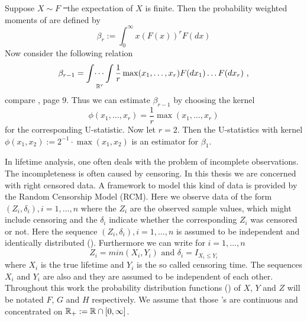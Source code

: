 %
\begin{example}
	Suppose $X\sim F$ \st\ the expectation of $X$ is finite. Then the probability weighted moments of are defined by
	$$\beta_r := \int_{0}^{\infty} x (F(x))^r F(dx) $$
	Now consider the following relation 
	$$\beta_{r-1} = \mathop{\int \dots \int}\limits_{\mathbb{R}^r} \frac{1}{r} \max(x_1, \dots, x_r) F(dx_1)\dots F(dx_r)\textrm{ ,}$$
	compare \cite{lee1990u}, page 9. Thus we can estimate $\beta_{r-1}$ by choosing the kernel 
	$$\phi(x_1,\dots,x_r) = \frac{1}{r} \max(x_1, \dots, x_r)$$
	for the corresponding U-statistic. Now let $r=2$. Then the U-statistics with kernel $\phi(x_1, x_2) := 2^{-1} \cdot \max(x_1, x_2)$ is an estimator for $\beta_1$. 
\end{example}
%
In lifetime analysis, one often deals with the problem of incomplete observations. The incompleteness is often caused by censoring. In this thesis we are concerned with right censored data. A framework to model this kind of data is provided by the Random Censorship Model (RCM). Here we observe data of the form $(Z_i, \delta_i), i=1,...,n$ where the $Z_i$ are the observed sample values, which might include censoring and the $\delta_i$ indicate whether the corresponding $Z_i$ was censored or not. Here the sequence $(Z_i, \delta_i), i=1,...,n$ is assumed to be independent and identically distributed (\iid). Furthermore we can write for $i=1,...,n$
$$Z_i = min(X_i,Y_i) \text{ and } \delta_i=I_{X_i\leq Y_i}$$
where $X_i$ is the true lifetime and $Y_i$ is the so called censoring time. The sequences $X_i$ and $Y_i$ are also \iid and they are assumed to be independent of each other. Throughout this work the probability distribution functions (\df) of $X$, $Y$ and $Z$ will be notated $F$, $G$ and $H$ respectively. We assume that those \df's are continuous and concentrated on $\mathbb{R}_+ := \mathbb{R}\cap [0,\infty]$.\\

